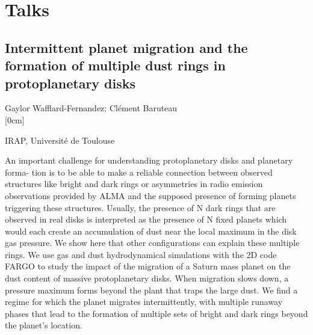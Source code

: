 \documentclass[a4paper,11pt]{book}
\begin{document}
\mainmatter


\chapter*{Talks}
        
          \section[Intermittent planet migration and the formation of multiple dust rings in protoplanetary disks \newline(Gaylor Wafflard-Fernandez)] { Intermittent planet migration and the formation of multiple dust rings in protoplanetary disks }



\begin{center}
{\large Gaylor Wafflard-Fernandez};{ \large  Clément Baruteau}\\



[0cm]



  
\vspace{2 mm}
\noindent IRAP, Université de Toulouse\\

\end{center}



  
\vspace{2 mm}
\noindent An important challenge for understanding protoplanetary disks and planetary forma- tion is to be able to make a reliable connection between observed structures like bright and dark rings or asymmetries in radio emission observations provided by ALMA and the supposed presence of forming planets triggering these structures. Usually, the presence of N dark rings that are observed in real disks is interpreted as the presence of N fixed planets which would each create an accumulation of dust near the local maximum in the disk gas pressure. We show here that other configurations can explain these multiple rings. We use gas and dust hydrodynamical simulations with the 2D code FARGO to study the impact of the migration of a Saturn mass planet on the dust content of massive protoplanetary disks. When migration slows down, a pressure maximum forms beyond the plant that traps the large dust. We find a regime for which the planet migrates intermittently, with multiple runaway phases that lead to the formation of multiple sets of bright and dark rings beyond the planet’s location.
\end{document}
